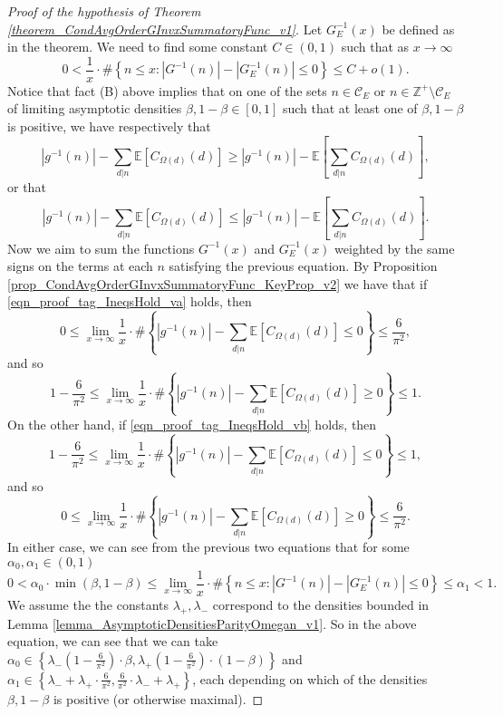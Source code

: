 \documentclass[11pt,reqno,a4letter]{article}
\numberwithin{figure}{section}
\numberwithin{table}{section}
\theoremstyle{plain}
\numberwithin{theorem}{section}
\theoremstyle{definition}
\begin{document}
\begin{proof}[Proof of the hypothesis of Theorem \ref{theorem_CondAvgOrderGInvxSummatoryFunc_v1}]
Let $G_E^{-1}(x)$ be defined as in the theorem. We need to find some constant $C \in (0, 1)$ such that 
as $x \rightarrow \infty$ 
\[
0 < \frac{1}{x} \cdot \#\left\{n \leq x: |G^{-1}(n)| - |G_E^{-1}(n)| \leq 0\right\} \leq 
     C + o(1). 
\]
Notice that fact (B) above implies that on one of the sets 
$n \in \mathcal{C}_E$ or $n \in \mathbb{Z}^{+} \setminus \mathcal{C}_E$ of 
limiting asymptotic densities $\beta, 1-\beta \in [0, 1]$ such that at least one of 
$\beta,1-\beta$ is positive, we have respectively that 
\begin{equation} 
\label{eqn_proof_tag_IneqsHold_va} 
|g^{-1}(n)| - \sum_{d|n} \mathbb{E}[C_{\Omega(d)}(d)] \geq |g^{-1}(n)| - 
     \mathbb{E}\left[\sum_{d|n} C_{\Omega(d)}(d)\right], 
\end{equation}
or that 
\begin{equation} 
\label{eqn_proof_tag_IneqsHold_vb} 
|g^{-1}(n)| - \sum_{d|n} \mathbb{E}[C_{\Omega(d)}(d)] \leq |g^{-1}(n)| - 
     \mathbb{E}\left[\sum_{d|n} C_{\Omega(d)}(d)\right]. 
\end{equation} 
Now we aim to sum the functions $G^{-1}(x)$ and $G_E^{-1}(x)$ weighted by the same signs on the 
terms at each $n$ satisfying the previous equation. 
By Proposition \ref{prop_CondAvgOrderGInvxSummatoryFunc_KeyProp_v2} we have that if 
\eqref{eqn_proof_tag_IneqsHold_va} holds, then 
\[
0 \leq \lim_{x \rightarrow \infty} \frac{1}{x} \cdot \#\left\{ 
     |g^{-1}(n)| - \sum_{d|n} \mathbb{E}[C_{\Omega(d)}(d)] \leq 0 \right\} \leq \frac{6}{\pi^2}, 
\]
and so 
\[
1 - \frac{6}{\pi^2} \leq \lim_{x \rightarrow \infty} \frac{1}{x} \cdot \#\left\{ 
     |g^{-1}(n)| - \sum_{d|n} \mathbb{E}[C_{\Omega(d)}(d)] \geq 0 \right\} \leq 1.  
\]
On the other hand, if \eqref{eqn_proof_tag_IneqsHold_vb} holds, then 
\[
1 - \frac{6}{\pi^2} \leq \lim_{x \rightarrow \infty} \frac{1}{x} \cdot \#\left\{ 
     |g^{-1}(n)| - \sum_{d|n} \mathbb{E}[C_{\Omega(d)}(d)] \leq 0 \right\} \leq 1, 
\]
and so 
\[
0 \leq \lim_{x \rightarrow \infty} \frac{1}{x} \cdot \#\left\{ 
     |g^{-1}(n)| - \sum_{d|n} \mathbb{E}[C_{\Omega(d)}(d)] \geq 0 \right\} \leq \frac{6}{\pi^2}.  
\]
In either case, we can see from the previous two 
equations that for some $\alpha_0, \alpha_1 \in (0, 1)$ 
\[
0 < \alpha_0 \cdot \min(\beta, 1-\beta) \leq \lim_{x \rightarrow \infty} \frac{1}{x} \cdot 
     \#\left\{n \leq x: |G^{-1}(n)| - |G_E^{-1}(n)| \leq 0\right\} \leq 
     \alpha_1 < 1. 
\] 
We assume the the constants $\lambda_{+}, \lambda_{-}$ correspond to the densities bounded in 
Lemma \ref{lemma_AsymptoticDensitiesParityOmegan_v1}. 
So in the above equation, we can see that we can take 
$\alpha_0 \in \left\{\lambda_{-}\left(1-\frac{6}{\pi^2}\right) \cdot \beta, 
 \lambda_{+} \left(1-\frac{6}{\pi^2}\right) \cdot (1-\beta)\right\}$ and 
$\alpha_1 \in \left\{\lambda_{-} + \lambda_{+} \cdot \frac{6}{\pi^2}, \frac{6}{\pi^2} \cdot \lambda_{-} + \lambda_{+}\right\}$, 
each depending on which of the densities $\beta,1-\beta$ is positive (or otherwise maximal). 
\end{proof} 
\end{document}
